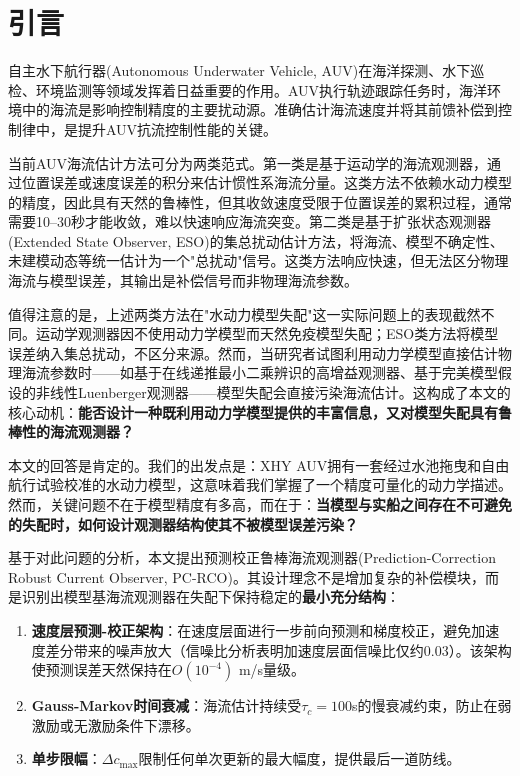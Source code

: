 \section{引言}

自主水下航行器(Autonomous Underwater Vehicle, AUV)在海洋探测、水下巡检、环境监测等领域发挥着日益重要的作用\cite{fossen2011handbook}。AUV执行轨迹跟踪任务时，海洋环境中的海流是影响控制精度的主要扰动源。准确估计海流速度并将其前馈补偿到控制律中，是提升AUV抗流控制性能的关键\cite{borhaug2007model}。

当前AUV海流估计方法可分为两类范式。第一类是基于运动学的海流观测器\cite{liang2018three,he2024three}，通过位置误差或速度误差的积分来估计惯性系海流分量。这类方法不依赖水动力模型的精度，因此具有天然的鲁棒性，但其收敛速度受限于位置误差的累积过程，通常需要10--30秒才能收敛，难以快速响应海流突变。第二类是基于扩张状态观测器(Extended State Observer, ESO)的集总扰动估计方法\cite{xie2020extended}，将海流、模型不确定性、未建模动态等统一估计为一个"总扰动"信号。这类方法响应快速，但无法区分物理海流与模型误差，其输出是补偿信号而非物理海流参数。

值得注意的是，上述两类方法在"水动力模型失配"这一实际问题上的表现截然不同。运动学观测器因不使用动力学模型而天然免疫模型失配；ESO类方法将模型误差纳入集总扰动，不区分来源。然而，当研究者试图利用动力学模型直接估计物理海流参数时——如\cite{kim2018estimating}基于在线递推最小二乘辨识的高增益观测器、\cite{borhaug2007model}基于完美模型假设的非线性Luenberger观测器——模型失配会直接污染海流估计。这构成了本文的核心动机：\textbf{能否设计一种既利用动力学模型提供的丰富信息，又对模型失配具有鲁棒性的海流观测器？}

本文的回答是肯定的。我们的出发点是：XHY AUV拥有一套经过水池拖曳和自由航行试验校准的水动力模型，这意味着我们掌握了一个精度可量化的动力学描述。然而，关键问题不在于模型精度有多高，而在于：\textbf{当模型与实船之间存在不可避免的失配时，如何设计观测器结构使其不被模型误差污染？}

基于对此问题的分析，本文提出预测校正鲁棒海流观测器(Prediction-Correction Robust Current Observer, PC-RCO)。其设计理念不是增加复杂的补偿模块，而是识别出模型基海流观测器在失配下保持稳定的\textbf{最小充分结构}：

\begin{enumerate}
    \item \textbf{速度层预测-校正架构}：在速度层面进行一步前向预测和梯度校正，避免加速度差分带来的噪声放大（信噪比分析表明加速度层面信噪比仅约0.03）。该架构使预测误差天然保持在$O(10^{-4})$ m/s量级。
    \item \textbf{Gauss-Markov时间衰减}：海流估计持续受$\tau_c=100$s的慢衰减约束，防止在弱激励或无激励条件下漂移。
    \item \textbf{单步限幅}：$\Delta c_{\max}$限制任何单次更新的最大幅度，提供最后一道防线。
\end{enumerate}

